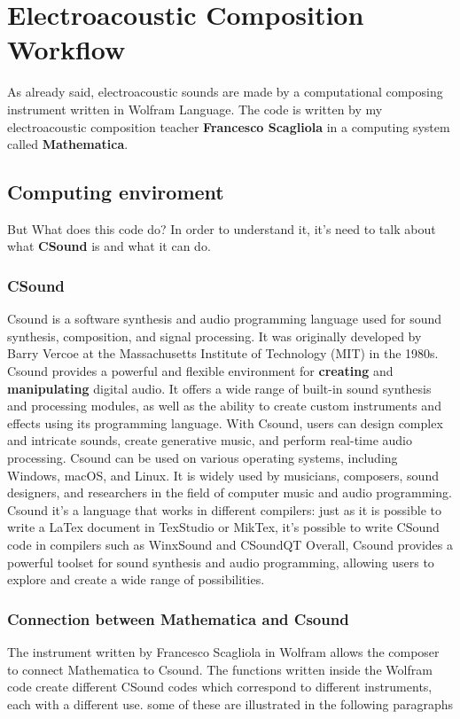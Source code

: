
\chapter{Electroacoustic Composition Workflow}
\label{chp:fundamentals}

As already said, electroacoustic sounds are made by a computational composing instrument written in Wolfram Language. The code is written by my electroacoustic composition teacher \textbf{Francesco Scagliola} in a computing system called \textbf{Mathematica}.
	
	\section{Computing enviroment}
	But What does this code do?
	In order to understand it, it's need to talk about what \textbf{CSound} is and what it can do.
	
		\subsection{CSound}
		Csound is a software synthesis and audio programming language used for sound synthesis, composition, and signal processing. It was originally developed by Barry Vercoe at the Massachusetts Institute of Technology (MIT) in the 1980s.
		Csound provides a powerful and flexible environment for \textbf{creating} and \textbf{manipulating} digital audio. It offers a wide range of built-in sound synthesis and processing modules, as well as the ability to create custom instruments and effects using its programming language. With Csound, users can design complex and intricate sounds, create generative music, and perform real-time audio processing.
		Csound can be used on various operating systems, including Windows, macOS, and Linux. It is widely used by musicians, composers, sound designers, and researchers in the field of computer music and audio programming.
		Csound it's a language that works in different compilers: just as it is possible to write a LaTex document in TexStudio or MikTex, it's possible to write CSound code in compilers such as WinxSound and CSoundQT
		Overall, Csound provides a powerful toolset for sound synthesis and audio programming, allowing users to explore and create a wide range of possibilities.
		
		\subsection{Connection between Mathematica and Csound}
		The instrument written by Francesco Scagliola in Wolfram allows the composer to connect Mathematica to Csound.
		The functions written inside the Wolfram code create different CSound codes which correspond to different instruments, each with a different use. some of these are illustrated in the following paragraphs
		
